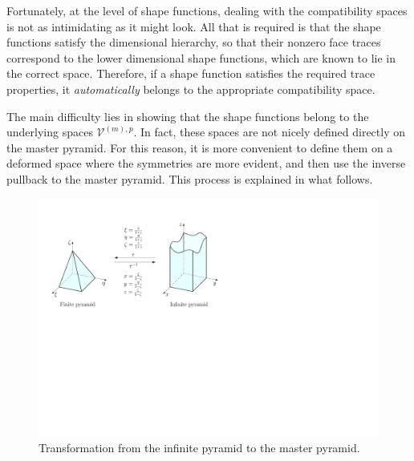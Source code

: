 Fortunately, at the level of shape functions, dealing with the compatibility spaces is not as intimidating as it might look.
All that is required is that the shape functions satisfy the dimensional hierarchy, so that their nonzero face traces correspond to the lower dimensional shape functions, which are known to lie in the correct space.
Therefore, if a shape function satisfies the required trace properties, it \textit{automatically} belongs to the appropriate compatibility space.

The main difficulty lies in showing that the shape functions belong to the underlying spaces $\mathcal{V}^{(m),p}$.
In fact, these spaces are not nicely defined directly on the master pyramid.
For this reason, it is more convenient to define them on a deformed space where the symmetries are more evident, and then use the inverse pullback to the master pyramid.
This process is explained in what follows.


\begin{figure}[!ht]
\begin{center}
\includegraphics[scale=0.5]{./figures/PyramidSingleTransform.pdf}
\caption{Transformation from the infinite pyramid to the master pyramid.}
\label{fig:PyramidSingleTransform}
\end{center}
\end{figure}

